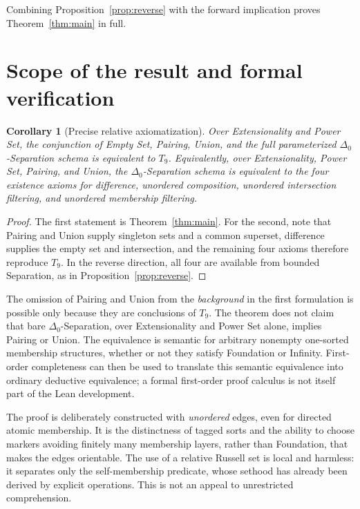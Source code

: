 \documentclass[11pt,a4paper]{article}
\numberwithin{equation}{section}
\newtheorem{corollary}[theorem]{Corollary}
\newcommand{\Dzero}{\Delta_0}
\newcommand{\Tnine}{T_9}
\begin{document}
Combining Proposition~\ref{prop:reverse} with the forward implication proves Theorem~\ref{thm:main} in full.

\section{Scope of the result and formal verification}
\begin{corollary}[Precise relative axiomatization]\label{cor:precise}
Over Extensionality and Power Set, the conjunction of Empty Set, Pairing, Union, and the full parameterized $\Dzero$-Separation schema is equivalent to $\Tnine$.  Equivalently, \emph{over Extensionality, Power Set, Pairing, and Union}, the $\Dzero$-Separation schema is equivalent to the four existence axioms for difference, unordered composition, unordered intersection filtering, and unordered membership filtering.
\end{corollary}
\begin{proof}
The first statement is Theorem~\ref{thm:main}.  For the second, note that Pairing and Union supply singleton sets and a common superset, difference supplies the empty set and intersection, and the remaining four axioms therefore reproduce $\Tnine$.  In the reverse direction, all four are available from bounded Separation, as in Proposition~\ref{prop:reverse}.
\end{proof}

The omission of Pairing and Union from the \emph{background} in the first formulation is possible only because they are conclusions of $\Tnine$.  The theorem does not claim that bare $\Dzero$-Separation, over Extensionality and Power Set alone, implies Pairing or Union.  The equivalence is semantic for arbitrary nonempty one-sorted membership structures, whether or not they satisfy Foundation or Infinity.  First-order completeness can then be used to translate this semantic equivalence into ordinary deductive equivalence; a formal first-order proof calculus is not itself part of the Lean development.

The proof is deliberately constructed with \emph{unordered} edges, even for directed atomic membership.  It is the distinctness of tagged sorts and the ability to choose markers avoiding finitely many membership layers, rather than Foundation, that makes the edges orientable.  The use of a relative Russell set is local and harmless: it separates only the self-membership predicate, whose sethood has already been derived by explicit operations.  This is not an appeal to unrestricted comprehension.
\end{document}
